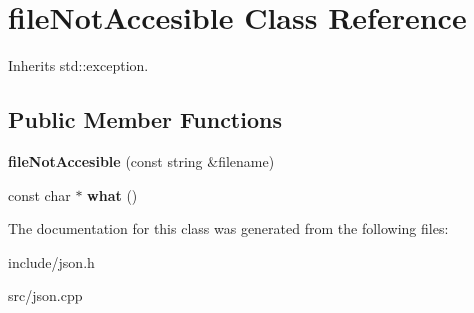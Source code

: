 \hypertarget{classfileNotAccesible}{\section{file\-Not\-Accesible \-Class \-Reference}
\label{classfileNotAccesible}
}


\-Inherits std\-::exception.

\subsection*{\-Public \-Member \-Functions}
\begin{DoxyCompactItemize}
\item 
\hypertarget{classfileNotAccesible_a463510e4a6eaa594b213c44e80dc8189}{{\bfseries file\-Not\-Accesible} (const string \&filename)}\label{classfileNotAccesible_a463510e4a6eaa594b213c44e80dc8189}

\item 
\hypertarget{classfileNotAccesible_ab4f56c3a4a441211d290c5f57f89b90a}{const char $\ast$ {\bfseries what} ()}\label{classfileNotAccesible_ab4f56c3a4a441211d290c5f57f89b90a}

\end{DoxyCompactItemize}


\-The documentation for this class was generated from the following files\-:\begin{DoxyCompactItemize}
\item 
include/json.\-h\item 
src/json.\-cpp\end{DoxyCompactItemize}
